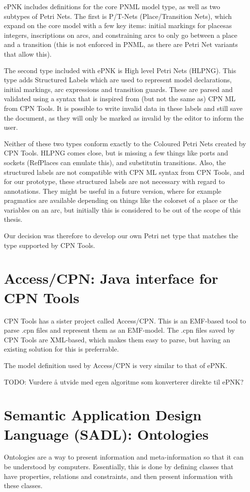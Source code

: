 ePNK includes definitions for the core PNML model type, as well as two
subtypes of Petri Nets. The first is P/T-Nets (Place/Transition Nets), which
expand on the core model with a few key items: initial markings for placesas
integers, inscriptions on arcs, and constraining arcs to only go between a place
and a transition (this is not enforced in PNML, as there are Petri Net variants that
allow this). 

The second type included with ePNK is High level Petri Nets (HLPNG). This type
adds Structured Labels which are used to represent model declarations, initial
markings, arc expressions and transition guards.
These are parsed and validated using a syntax that is inspired from (but not the
same as) CPN ML from CPN Tools. It is possible to write invalid data in these
labels and still save the document, as they will only be marked as invalid by
the editor to inform the user.

Neither of these two types conform exactly to the Coloured Petri Nets created by
CPN Tools. HLPNG comes close, but is missing a few things like ports and sockets
(RefPlaces can emulate this), and substitutin transitions. Also, the
structured labels are not compatible with CPN ML syntax from CPN Tools, and for
our prototype, these structured labels are not necessary with regard to
annotations. They might be useful in a future version, where for example
pragmatics are available depending on things like the colorset of a place or the
variables on an arc, but initially this is considered to be out of the scope of
this thesis.

Our decision was therefore to develop our own Petri net type that matches the
type supported by CPN Tools.

\section{Access/CPN: Java interface for CPN Tools}
CPN Tools has a sister project called Access/CPN. This is an
EMF-based tool to parse .cpn files and represent them as an
EMF-model. The .cpn files saved by CPN Tools are XML-based, which makes them
easy to parse, but having an existing solution for this is preferrable.

The model definition used by Access/CPN is very similar to that of ePNK.

TODO: Vurdere å utvide med egen algoritme som konverterer direkte til ePNK?

\section{Semantic Application Design Language (SADL): Ontologies}
Ontologies are a way to present information and meta-information so that it can
be understood by computers. Essentially, this is done by defining classes that
have properties, relations and constraints, and then present
information with these classes.

